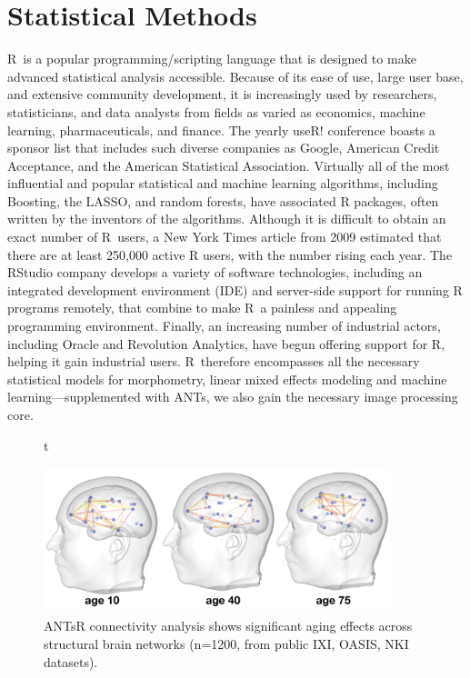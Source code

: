 
\section{Statistical Methods}\label{sec:R}
{\small{}  }


R~is a popular
programming/scripting language that is designed to make advanced
statistical analysis accessible.  Because of its ease of use, large user base, and
extensive community development, it is increasingly used by
researchers, statisticians, and data analysts from fields as varied as
economics, machine learning, pharmaceuticals, and finance.  The yearly
useR! conference boasts a sponsor list that includes such diverse
companies as Google, American Credit Acceptance, and the American
Statistical Association.  Virtually all of the most
influential and popular statistical and machine learning algorithms,
including Boosting, the LASSO, and random forests, have associated R
packages, often written by the inventors of the algorithms.  Although
it is difficult to obtain an exact number of R~users, a New York Times
article from 2009 estimated that there are at least 250,000 active R
users, with the number rising each year.  The RStudio company
develops a variety of software technologies, including an integrated
development environment (IDE) and server-side support for running R
programs remotely, that combine to make R~a painless and appealing
programming environment.  Finally, an increasing number of industrial actors, including
Oracle and Revolution Analytics, have begun offering support for R,
helping it gain industrial users.  R~therefore encompasses all the
necessary statistical models for morphometry, linear mixed effects
modeling and machine learning---supplemented with ANTs, we also gain
the necessary image processing core.


\begin{figure}{t}
\begin{center}
  \includegraphics[width=0.9\textwidth]{figs/connx_age}
\end{center}
\caption{ANTsR connectivity analysis shows significant aging effects
  across structural brain networks (n=1200, from public IXI, OASIS, NKI datasets).}\label{fig:cnx}
\end{figure}

